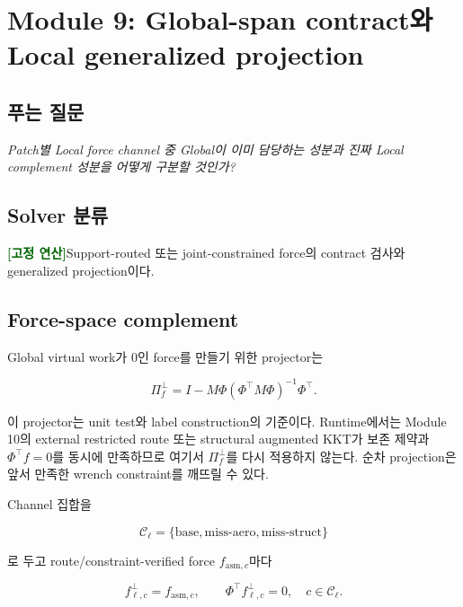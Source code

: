 \documentclass[11pt,a4paper]{article}
\newcommand{\deterministic}{\textcolor{darkgreen}{\textbf{[고정 연산]}}}
\begin{document}
\section{Module 9: Global-span contract와 Local generalized projection}

\subsection*{푸는 질문}

\emph{Patch별 Local force channel 중 Global이 이미 담당하는 성분과
진짜 Local complement 성분을 어떻게 구분할 것인가?}

\subsection*{Solver 분류}

\deterministic Support-routed 또는 joint-constrained force의 contract 검사와 generalized projection이다.

\subsection*{Force-space complement}

Global virtual work가 0인 force를 만들기 위한 projector는

\begin{equation}
  \Pi_f^\perp
  =
  I-M\Phi(\Phi^\top M\Phi)^{-1}\Phi^\top.
  \label{eq:force-complement}
\end{equation}

이 projector는 unit test와 label construction의 기준이다.
Runtime에서는 Module 10의 external restricted route 또는 structural augmented KKT가
보존 제약과 \(\Phi^\top f=0\)를 동시에 만족하므로 여기서 \(\Pi_f^\perp\)를 다시 적용하지 않는다.
순차 projection은 앞서 만족한 wrench constraint를 깨뜨릴 수 있다.

Channel 집합을

\begin{equation}
  \mathcal C_\ell
  =\{\mathrm{base},\mathrm{miss\mbox{-}aero},\mathrm{miss\mbox{-}struct}\}
\end{equation}

로 두고 route/constraint-verified force \(f_{\mathrm{asm},c}\)마다

\begin{equation}
  f_{\ell,c}^\perp
  =
  f_{\mathrm{asm},c},
  \qquad
  \Phi^\top f_{\ell,c}^\perp=0,
  \quad c\in\mathcal C_\ell.
\end{equation}
\end{document}
